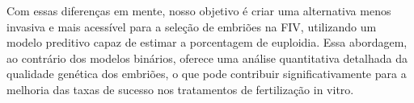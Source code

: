 Com essas diferenças em mente, nosso objetivo é criar uma alternativa menos invasiva e mais acessível para a seleção de embriões na FIV, utilizando um modelo preditivo capaz de estimar a porcentagem de euploidia. Essa abordagem, ao contrário dos modelos binários, oferece uma análise quantitativa detalhada da qualidade genética dos embriões, o que pode contribuir significativamente para a melhoria das taxas de sucesso nos tratamentos de fertilização in vitro.